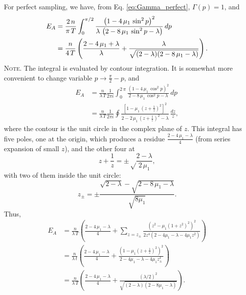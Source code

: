 \documentclass[reprint, floatfix]{revtex4-1}
\newcommand{\note}[1]{{\color{DarkGreen}\footnotesize \textsc{Note.} #1}}
\newcommand{\Err}{E}
\begin{document}
For perfect sampling,
we have, from Eq. \eqref{eq:Gamma_perfect},
$\Gamma(p) = 1$, and
$$
\begin{aligned}
\Err_A
&=
\frac{2 \, n}{\pi \, T}
\int_0^{\pi/2}
\frac{ \left(1 - 4 \, \mu_1 \, \sin^2 p \right)^2 }
{ \lambda \, \left(2 - 8 \, \mu_1 \, \sin^2 p - \lambda \right) }
\, dp
\notag \\
&=
\frac{n}{4 \, T}
\left(
  \frac{2 - 4 \, \mu_1 + \lambda}{ \lambda }
  +
  \frac{ \lambda }
  { \sqrt{ (2 - \lambda) (2 - 8 \, \mu_1 - \lambda) } }
\right).
\end{aligned}
$$
\note{The integral is evaluated by contour integration.
%
It is somewhat more convenient to change variable $p \to \frac{ \pi } { 2 } - p$,
and
$$
\begin{aligned}
\Err_A
&=
\frac{n}{\lambda \, T}
\frac{1}{2 \pi i}
\int_0^{2 \, \pi}
\frac{ \left(1 - 4 \, \mu_1 \, \cos^2 p \right)^2 }
{ 2 - 8 \, \mu_1 \, \cos^2 p - \lambda }
\, dp
\\
&=
\frac{n}{\lambda \, T}
\frac{1}{2 \pi i}
\oint
\frac{ \left[1 - \mu_1 \, \left(z+\frac{1}{z}\right)^2 \right]^2 }
{ 2 - 2 \, \mu_1 \, \left(z + \frac{1}{z}\right)^2 - \lambda }
\, \frac{dz}{z},
\end{aligned}
$$
where the contour is the unit circle
in the complex plane of $z$.
%
This integral has five poles, one at the origin,
which produces a residue
$\frac{2 - 4 \, \mu_1 - \lambda}{4}$
(from series expansion of small $z$),
and the other four at
$$
z + \frac{1}{z} = \pm\sqrt\frac{2-\lambda}{2 \, \mu_1},
$$
with two of them inside the unit circle:
$$
z_\pm = \pm \frac{\sqrt{2-\lambda} -\sqrt{2 - 8 \, \mu_1 - \lambda}}
{\sqrt{8 \mu_1}}.
$$
Thus,
$$
\begin{aligned}
\Err_A
&=
\frac{      n       }
     { \lambda \, T }
\left(
 \frac{ 2 - 4 \, \mu_1 - \lambda }
      {          4               }
 +
 \sum_{z = z_{\pm} }
 \frac{ \left(z^2 - \mu_1 (1 + z^2)^2 \right)^2 }
 { 2 z^4 (2 - 4 \mu_1 - \lambda - 4 \mu_1 z^2) }
\right)
\\
&=
\frac{       n      }
     { \lambda \, t }
\left(
  \frac{ 2 - 4 \, \mu_1 - \lambda }
       {          4               }
 +
 \frac{ \left(1 - \mu_1 \left(z + \frac{1}{z} \right)^2 \right)^2 }
      { 2 - 4 \mu_1 - \lambda - 4 \mu_1 z_{\pm}^2                 }
\right)
\\
&=
\frac{       n      }
     { \lambda \, T }
\left(
  \frac{ 2 - 4 \, \mu_1 - \lambda }
       {          4               }
 +
 \frac{ (\lambda/2)^2 }
 { \sqrt{(2-\lambda) (2 - 8 \mu_1 -\lambda)} }
\right).
\end{aligned}
$$
}
\end{document}
